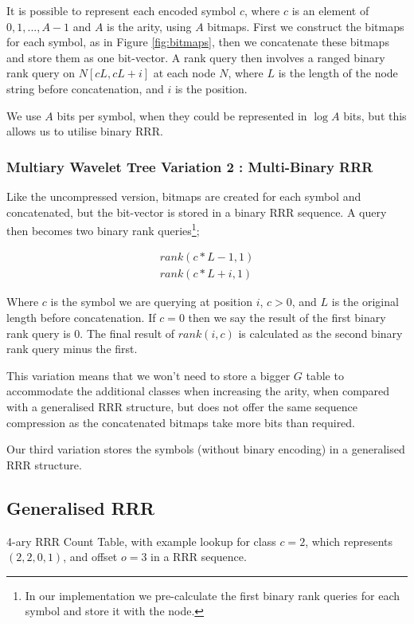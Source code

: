 It is possible to represent each encoded symbol $c$, where $c$ is an element of
${ 0, 1,..., A - 1}$ and $A$ is the arity, using $A$ bitmaps. First we construct
the bitmaps for each symbol, as in Figure \ref{fig:bitmaps}, then we concatenate 
these bitmaps and store them as one 
bit-vector. A rank query then involves a ranged binary rank query on $N[c L, c L 
+ i]$ at each node $N$, where $L$ is the length of the node string before 
concatenation, and $i$ is the position.

We use $A$ bits per symbol, when they could be represented in $\log A$ bits, but
this allows us to utilise binary RRR.

\subsubsection{Multiary Wavelet Tree Variation 2 : Multi-Binary RRR}
Like the uncompressed version, bitmaps are created for each symbol and 
concatenated, but the bit-vector is stored in a binary RRR sequence. A query 
then becomes two binary rank queries\footnote{In our implementation we 
pre-calculate the first binary rank queries for each symbol and store it with 
the node.};

	\begin{align}
	rank(c * L - 1, 1) \\
	rank(c * L + i, 1)
	\end{align}

Where $c$ is the symbol we are querying at position $i$,
$c > 0$, and $L$ is 
the original length before concatenation. If $c = 0$ then we say the result of 
the first binary rank query is $0$. The final result of $rank(i, c)$ is 
calculated as the second binary rank query minus the first.

This variation means that we won't need to store a bigger $G$ table to 
accommodate the additional classes when increasing the arity, when compared with
a generalised RRR structure, but does not offer the same sequence compression as
the concatenated bitmaps take more bits than required.

Our third variation stores the symbols (without binary encoding) in a 
generalised RRR structure.

\subsection{Generalised RRR}
\label{sec:gen-rrr}

	{4-ary RRR Count Table, with example lookup for class $c = 2$, 
	which represents $(2, 2, 0, 1)$, and offset $o = 3$ in a RRR
	sequence.}
	
